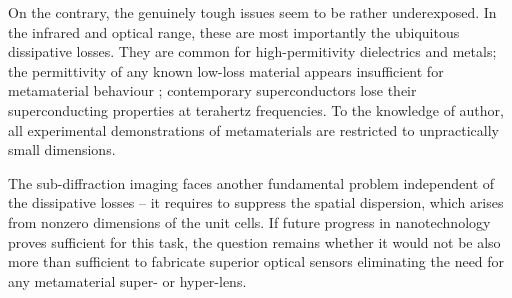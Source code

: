 On the contrary, the genuinely tough issues seem to be rather underexposed. In the infrared and optical range, these are most importantly the ubiquitous dissipative losses. They are common for high-permitivity dielectrics and metals; the permittivity of any known low-loss material appears insufficient for metamaterial behaviour \cite{dominec2014transition}; contemporary superconductors lose their superconducting properties at terahertz frequencies. To the knowledge of author, all experimental demonstrations of metamaterials are restricted to unpractically small dimensions. 
%

The sub-diffraction imaging faces another fundamental problem independent of the dissipative losses -- it requires to suppress the spatial dispersion, which arises from nonzero dimensions of the unit cells. If future progress in nanotechnology proves sufficient for this task, the question remains whether it would not be also more than sufficient to fabricate superior optical sensors eliminating the need for any metamaterial super- or hyper-lens. 

